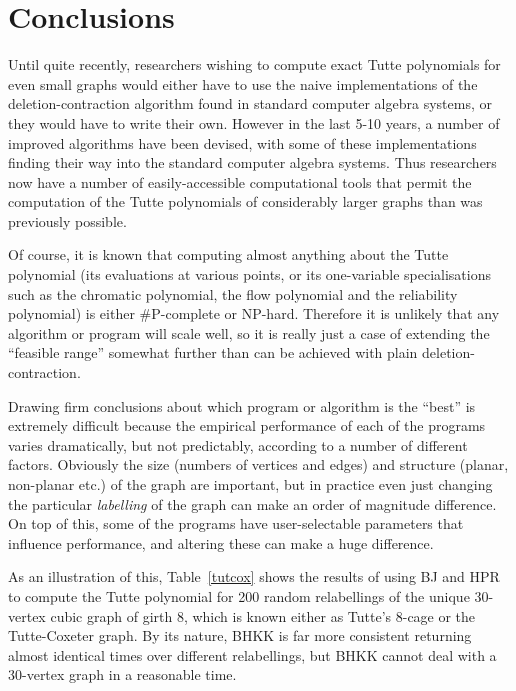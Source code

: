 
\section{Conclusions}  

Until quite recently, researchers wishing to compute exact Tutte polynomials for even small graphs would either have to use the naive implementations of the deletion-contraction algorithm found in standard computer algebra systems, or they would have to write their own. However in the last 5-10 years, a number of improved algorithms have been devised, with some of these implementations finding their way into the standard computer algebra systems. Thus researchers now have a number of easily-accessible computational tools that permit the computation of the Tutte polynomials of considerably larger graphs than was previously possible.

Of course, it is known that computing almost anything about the Tutte polynomial (its evaluations at various points, or its one-variable specialisations such as the chromatic polynomial, the flow polynomial and the reliability polynomial) is either \#P-complete or NP-hard. Therefore it is unlikely that any algorithm or program will scale well, so it is really just a case of extending the ``feasible range'' somewhat further than can be achieved with plain deletion-contraction.

Drawing firm conclusions about which program or algorithm is the ``best'' is extremely difficult because the empirical performance of each
of the programs varies dramatically, but not predictably, according to a number of different factors. Obviously the size (numbers of vertices and edges) and structure (planar, non-planar etc.) of the graph are important, but in practice even just changing the particular {\em labelling} of the graph can make an order of magnitude difference. On top of this, some of the programs have user-selectable parameters that influence performance, and altering these can make a huge difference.

As an illustration of this, Table~\ref{tutcox} shows the results of using BJ and HPR to compute the Tutte polynomial for 200 random relabellings of the unique 30-vertex cubic graph of girth 8, which is known either as Tutte's 8-cage or the Tutte-Coxeter graph. By its nature, BHKK is far more consistent returning almost identical times over different relabellings, but BHKK cannot deal with a 30-vertex graph in a reasonable time.

